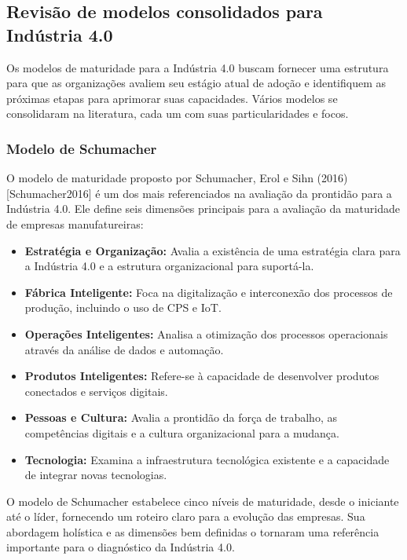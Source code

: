 \subsection{Revisão de modelos consolidados para Indústria 4.0 }

Os modelos de maturidade para a Indústria 4.0 buscam fornecer uma estrutura para que as organizações avaliem seu estágio atual de adoção e identifiquem as próximas etapas para aprimorar suas capacidades. Vários modelos se consolidaram na literatura, cada um com suas particularidades e focos.

\subsubsection{Modelo de Schumacher}

O modelo de maturidade proposto por Schumacher, Erol e Sihn (2016) [Schumacher2016] é um dos mais referenciados na avaliação da prontidão para a Indústria 4.0. Ele define seis dimensões principais para a avaliação da maturidade de empresas manufatureiras:
\begin{itemize}
    \item \textbf{Estratégia e Organização:} Avalia a existência de uma estratégia clara para a Indústria 4.0 e a estrutura organizacional para suportá-la.
    \item \textbf{Fábrica Inteligente:} Foca na digitalização e interconexão dos processos de produção, incluindo o uso de CPS e IoT.
    \item \textbf{Operações Inteligentes:} Analisa a otimização dos processos operacionais através da análise de dados e automação.
    \item \textbf{Produtos Inteligentes:} Refere-se à capacidade de desenvolver produtos conectados e serviços digitais.
    \item \textbf{Pessoas e Cultura:} Avalia a prontidão da força de trabalho, as competências digitais e a cultura organizacional para a mudança.
    \item \textbf{Tecnologia:} Examina a infraestrutura tecnológica existente e a capacidade de integrar novas tecnologias.
\end{itemize}

O modelo de Schumacher estabelece cinco níveis de maturidade, desde o iniciante até o líder, fornecendo um roteiro claro para a evolução das empresas. Sua abordagem holística e as dimensões bem definidas o tornaram uma referência importante para o diagnóstico da Indústria 4.0.

